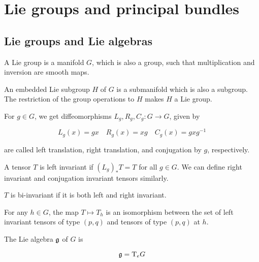 \section{Lie groups and principal bundles}

\subsection{Lie groups and Lie algebras}

\begin{definition}
     A Lie group is a manifold \(G\), which is also a group, such that multiplication and inversion are smooth maps.
\end{definition}

\begin{definition}
     An embedded Lie subgroup \(H\) of \(G\) is a submanifold which is also a subgroup. The restriction of the group operations to \(H\) makes \(H\) a Lie group.
\end{definition}

\begin{definition}
    
    For \(g \in G\), we get diffeomorphisms \(L_g, R_g, C_g : G \to G\), given by

    \[L_g(x) = gx \quad R_g(x) = xg \quad C_g(x) = gxg^{-1}\]

    are called left translation, right translation, and conjugation by \(g\), respectively.
\end{definition}

\begin{definition}
     A tensor \(T\) is left invariant if \((L_g)_*T = T\) for all \(g \in G\). We can define right invariant and conjugation invariant tensors similarly.

    \(T\) is bi-invariant if it is both left and right invariant.
\end{definition}

\begin{lemma}
    For any \(h \in G\), the map \(T \mapsto T_h\) is an isomorphism between the set of left invariant tensors of type \((p, q)\) and tensors of type \((p, q)\) at \(h\).
\end{lemma}

\begin{definition}
     The Lie algebra \(\mathfrak{g}\) of \(G\) is

    \[\mathfrak{g} = \mathrm{T}_eG\]
\end{definition}

